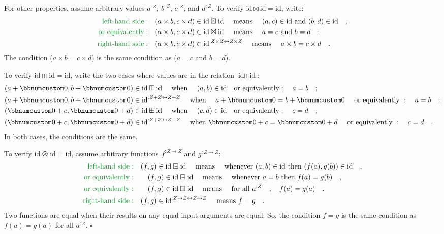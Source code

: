 For other properties, assume arbitrary values $a^{:Z}$, $b^{:Z}$,
$c^{:Z}$, and $d^{:Z}$. To verify $\text{id}\boxtimes\text{id}=\text{id}$,
write:
\begin{align*}
{\color{greenunder}\text{left-hand side}:}\quad & (a\times b,c\times d)\in\text{id}\boxtimes\text{id}\quad\text{ means }\quad(a,c)\in\text{id}\text{ and }(b,d)\in\text{id}\quad,\\
{\color{greenunder}\text{or equivalently}:}\quad & (a\times b,c\times d)\in\text{id}\boxtimes\text{id}\quad\text{ means }\quad a=c\text{ and }b=d\quad;\\
{\color{greenunder}\text{right-hand side}:}\quad & (a\times b,c\times d)\in\text{id}^{:Z\times Z\leftrightarrow Z\times Z}\quad\text{ means }\quad a\times b=c\times d\quad.
\end{align*}
The condition ($a\times b=c\times d$) is the same condition as ($a=c$
and $b=d$).

To verify $\text{id}\boxplus\text{id}=\text{id}$, write the two cases
where values are in the relation $\text{id}\boxplus\text{id}$:
\begin{align*}
 & (a+\bbnum 0,b+\bbnum 0)\in\text{id}\boxplus\text{id}\quad\text{ when }\quad(a,b)\in\text{id}\quad\text{or equivalently}:\quad a=b\quad;\\
 & (a+\bbnum 0,b+\bbnum 0)\in\text{id}^{:Z+Z\leftrightarrow Z+Z}\quad\text{ when }\quad a+\bbnum 0=b+\bbnum 0\quad\text{ or equivalently }:\quad a=b\quad;\\
 & (\bbnum 0+c,\bbnum 0+d)\in\text{id}\boxplus\text{id}\quad\text{ when }\quad(c,d)\in\text{id}\quad\text{or equivalently}:\quad c=d\quad;\\
 & (\bbnum 0+c,\bbnum 0+d)\in\text{id}^{:Z+Z\leftrightarrow Z+Z}\quad\text{ when }\bbnum 0+c=\bbnum 0+d\quad\text{ or equivalently }:\quad c=d\quad.
\end{align*}
In both cases, the conditions are the same.

To verify $\text{id}\ogreaterthan\text{id}=\text{id}$, assume arbitrary
functions $f^{:Z\rightarrow Z}$ and $g^{:Z\rightarrow Z}$:
\begin{align*}
{\color{greenunder}\text{left-hand side}:}\quad & (f,g)\in\text{id}\ogreaterthan\text{id}\quad\text{ means }\quad\text{whenever }(a,b)\in\text{id}\text{ then }(f(a),g(b))\in\text{id}\quad,\\
{\color{greenunder}\text{or equivalently}:}\quad & \quad(f,g)\in\text{id}\ogreaterthan\text{id}\quad\text{ means }\quad\text{whenever }a=b\text{ then }f(a)=g(b)\quad,\\
{\color{greenunder}\text{or equivalently}:}\quad & \quad(f,g)\in\text{id}\ogreaterthan\text{id}\quad\text{ means }\quad\text{for all }a^{:Z}\quad,\quad f(a)=g(a)\quad.\\
{\color{greenunder}\text{right-hand side}:}\quad & (f,g)\in\text{id}^{:Z\rightarrow Z\leftrightarrow Z\rightarrow Z}\quad\text{ means }f=g\quad.
\end{align*}
Two functions are equal when their results on any equal input arguments
are equal. So, the condition $f=g$ is the same condition as $f(a)=g(a)$
for all $a^{:Z}$. $\square$

